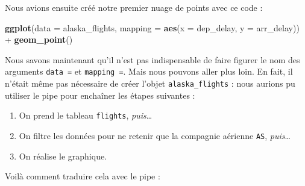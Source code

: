 \documentclass[
  a4paper,
]{article}
\newenvironment{Shaded}{\begin{snugshade}}{\end{snugshade}}
\newcommand{\DataTypeTok}[1]{\textcolor[rgb]{0.00,0.34,0.68}{#1}}
\newcommand{\KeywordTok}[1]{\textcolor[rgb]{0.12,0.11,0.11}{\textbf{#1}}}
\newcommand{\NormalTok}[1]{\textcolor[rgb]{0.12,0.11,0.11}{#1}}
\newcommand{\OperatorTok}[1]{\textcolor[rgb]{0.12,0.11,0.11}{#1}}
\newcommand{\StringTok}[1]{\textcolor[rgb]{0.75,0.01,0.01}{#1}}
\providecommand{\tightlist}{%
  \setlength{\itemsep}{0pt}\setlength{\parskip}{0pt}}
\begin{document}
Nous avions ensuite créé notre premier nuage de points avec ce code :

\begin{Shaded}
\begin{Highlighting}[]
\KeywordTok{ggplot}\NormalTok{(}\DataTypeTok{data =}\NormalTok{ alaska_flights, }\DataTypeTok{mapping =} \KeywordTok{aes}\NormalTok{(}\DataTypeTok{x =}\NormalTok{ dep_delay, }\DataTypeTok{y =}\NormalTok{ arr_delay)) }\OperatorTok{+}\StringTok{ }
\StringTok{  }\KeywordTok{geom_point}\NormalTok{()}
\end{Highlighting}
\end{Shaded}

Nous savons maintenant qu'il n'est pas indispensable de faire figurer le nom des arguments \texttt{data\ =} et \texttt{mapping\ =}. Mais nous pouvons aller plus loin. En fait, il n'était même pas nécessaire de créer l'objet \texttt{alaska\_flights} : nous aurions pu utiliser le pipe pour enchaîner les étapes suivantes :

\begin{enumerate}
\def\labelenumi{\arabic{enumi}.}
\tightlist
\item
  On prend le tableau \texttt{flights}, \emph{puis}\ldots{}
\item
  On filtre les données pour ne retenir que la compagnie aérienne \texttt{AS}, \emph{puis}\ldots{}
\item
  On réalise le graphique.
\end{enumerate}

Voilà comment traduire cela avec le pipe :

\begin{Shaded}
\end{Shaded}
\end{document}
